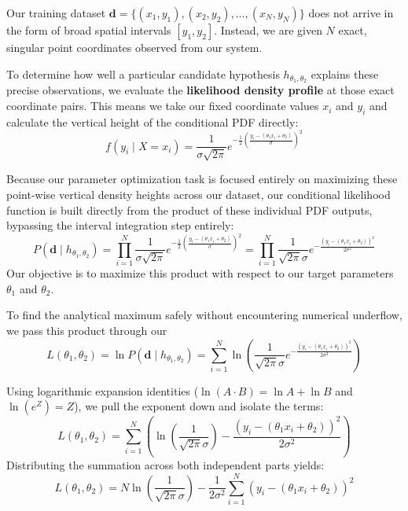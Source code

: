 Our training dataset $\mathbf{d} = \{(x_1, y_1), (x_2, y_2), \dots, (x_N, y_N)\}$ does not arrive in the form of broad spatial intervals $[y_1, y_2]$. Instead, we are given $N$ exact, singular point coordinates observed from our system. 

To determine how well a particular candidate hypothesis $h_{\theta_1, \theta_2}$ explains these precise observations, we evaluate the \textbf{likelihood density profile} at those exact coordinate pairs. This means we take our fixed coordinate values $x_i$ and $y_i$ and calculate the vertical height of the conditional PDF directly:
\[
f(y_i \mid X = x_i) = \frac{1}{\sigma \sqrt{2\pi}} e^{-\frac{1}{2}\left(\frac{y_i - (\theta_1 x_i + \theta_2)}{\sigma}\right)^2}
\]

Because our parameter optimization task is focused entirely on maximizing these point-wise vertical density heights across our  dataset, our conditional likelihood function is built directly from the product of these individual PDF outputs, bypassing the interval integration step entirely:
\[
P(\mathbf{d} \mid h_{\theta_1, \theta_2}) = \prod_{i=1}^{N} \frac{1}{\sigma \sqrt{2\pi}} e^{-\frac{1}{2}\left(\frac{y_i - (\theta_1 x_i + \theta_2)}{\sigma}\right)^2} = \prod_{i=1}^{N} \frac{1}{\sqrt{2\pi}\sigma} e^{-\frac{(y_i - (\theta_1 x_i + \theta_2))^2}{2\sigma^2}}
\]
Our objective is to maximize this product with respect to our target parameters $\theta_1$ and $\theta_2$.


To find the analytical maximum safely without encountering numerical underflow, we pass this product through our 
\[
L(\theta_1, \theta_2) = \ln P(\mathbf{d} \mid h_{\theta_1, \theta_2}) = \sum_{i=1}^{N} \ln \left( \frac{1}{\sqrt{2\pi}\sigma} e^{-\frac{(y_i - (\theta_1 x_i + \theta_2))^2}{2\sigma^2}} \right)
\]

Using logarithmic expansion identities ($\ln(A \cdot B) = \ln A + \ln B$ and $\ln(e^Z) = Z$), we pull the exponent down and isolate the terms:
\[
L(\theta_1, \theta_2) = \sum_{i=1}^{N} \left( \ln\left(\frac{1}{\sqrt{2\pi}\sigma}\right) - \frac{(y_i - (\theta_1 x_i + \theta_2))^2}{2\sigma^2} \right)
\]
Distributing the summation across both independent parts yields:
\[
L(\theta_1, \theta_2) = N \ln\left(\frac{1}{\sqrt{2\pi}\sigma}\right) - \frac{1}{2\sigma^2} \sum_{i=1}^{N} \left(y_i - (\theta_1 x_i + \theta_2)\right)^2
\]

